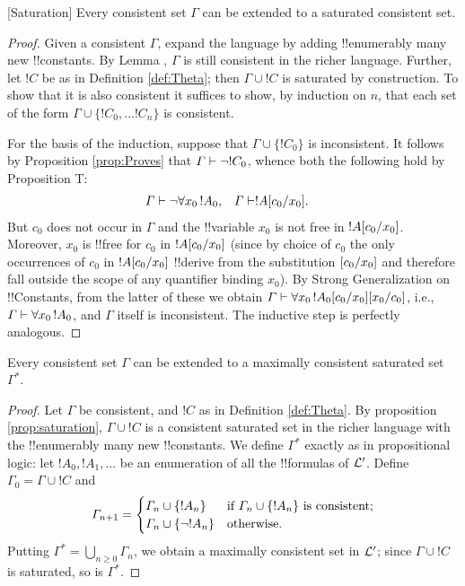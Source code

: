 \documentclass[../../include/open-logic-section]{subfiles}
\begin{document}
\begin{prop}[Saturation]
  Every consistent set $\Gamma$ can be extended to a saturated
  consistent set.
\end{prop}

\begin{proof}
Given a consistent $\Gamma$, expand the language by adding !!{enumerably}
many new !!{constant}s. By Lemma , $\Gamma$ is
  still consistent in the richer language. Further, let $!C$ be as
  in Definition \ref{def:Theta}; then $\Gamma \cup !C$ is
  saturated by construction. To show that it is also consistent it
  suffices to show, by induction on $n$, that each set of the form
  $\Gamma \cup \{!C_0,\ldots!C_n \}$ is consistent.

  For the basis of the induction, suppose that $\Gamma \cup \{!C_0
  \}$ is inconsistent. It follows by Proposition \ref{prop:Proves}
  that $\Gamma \Proves \lnot !C_0$, whence both the following hold
  by Proposition T:
  \begin{align*}
    \Gamma & \Proves \lnot \lforall[x_0][!A_0], & \Gamma & \Proves
    \Subst{!A}{c_0}{x_0}.
  \end{align*}
  But $c_0$ does not occur in $\Gamma$ and the !!{variable} $x_0$ is not
  free in $!A[c_0/x_0]$. Moreover, $x_0$ is !!{free for} $c_0$
  in $!A[c_0/x_0]$ (since by choice of $c_0$ the only
  occurrences of $c_0$ in $!A[c_0/x_0]$ !!{derive} from the
  substitution $[c_0/x_0]$ and therefore fall outside the scope
  of any quantifier binding $x_0$). By Strong Generalization on
!!{Constants}, from the latter of these we obtain $\Gamma \Proves \lforall
[x_0][\Subst{!A_0}{c_0}{x_0}] \Subst{}{x_0}{c_0}$, i.e., $\Gamma \Proves
  \lforall[x_0][!A_0]$, and $\Gamma$ itself is inconsistent. The
  inductive step is perfectly analogous.
\end{proof}

\begin{prop}\label{prop:maximal}
  Every consistent set $\Gamma$ can be extended to a maximally
  consistent saturated set $\Gamma^*$.
\end{prop}


\begin{proof} Let $\Gamma$ be consistent, and $!C$ as in
  Definition \ref{def:Theta}. By proposition \ref{prop:saturation},
  $\Gamma \cup !C$ is a consistent saturated set in the richer
  language with the !!{enumerably} many new !!{constant}s.  We define
  $\Gamma^*$ exactly as in propositional logic: let $!A_0,
  !A_1,\ldots$ be an enumeration of all the !!{formula}s of
  $\mathcal L'$. Define $\Gamma_0 = \Gamma \cup !C$ and
  \[
 \Gamma_{n+1} = 
    \begin{cases}
      \Gamma_n\cup\{!A_n\} & \text{if $ \Gamma_n\cup\{!A_n\}$
        is consistent;}\\
      \Gamma_n\cup\{\lnot!A_n\} & \text{otherwise}.
    \end{cases}
  \]
  Putting $\Gamma^* = \bigcup_{n\ge 0}\Gamma_n$, we obtain a maximally
  consistent set in $\mathcal L'$; since $\Gamma \cup !C$ is
  saturated, so is $\Gamma^*$.
\end{proof}
\end{document}
